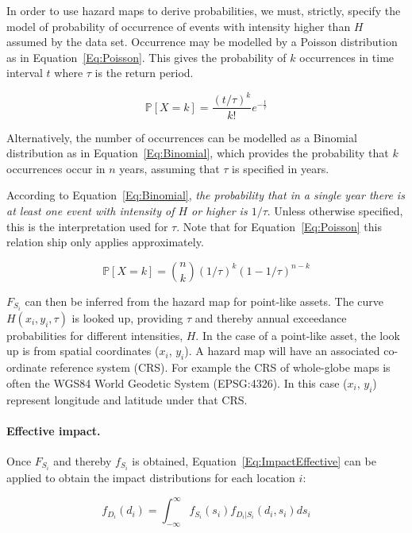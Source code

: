 \documentclass[a4paper,11pt]{extarticle} %
\begin{document}
In order to use hazard maps to derive probabilities, we must, strictly, specify the model of probability of occurrence of events with intensity higher than $H$ assumed by the data set. Occurrence may be modelled by a Poisson distribution as in Equation~\ref{Eq:Poisson}. This gives the probability of $k$ occurrences in time interval $t$ where $\tau$ is the return period.

 \begin{equation}
	\label{Eq:Poisson}
	\mathbb{P}[X = k] = \frac{(t / \tau)^k}{k!}  e^{-\frac{t}{\tau}}
\end{equation}

Alternatively, the number of occurrences can be modelled as a Binomial distribution as in Equation~\ref{Eq:Binomial}, which provides the probability that $k$ occurrences occur in $n$ years, assuming that $\tau$ is specified in years.  

According to Equation~\ref{Eq:Binomial}, \emph{the probability that in a single year there is at least one event with intensity of $H$ or higher is $1/\tau$}. Unless otherwise specified, this is the interpretation used for $\tau$. Note that for Equation~\ref{Eq:Poisson} this relation ship only applies approximately.

 \begin{equation}
	\label{Eq:Binomial}
	\mathbb{P}[X = k] = \binom{n}{k} (1/\tau)^k (1-1/\tau)^{n - k}
\end{equation}

$F_{S_i}$ can then be inferred from the hazard map for point-like assets. The curve $H(x_i, y_i, \tau)$ is looked up, providing $\tau$ and thereby annual exceedance probabilities for different intensities, $H$. In the case of a point-like asset, the look up is from spatial coordinates ($x_i$, $y_i$). A hazard map will have an associated co-ordinate reference system (CRS). For example the CRS of whole-globe maps is often the WGS84 World Geodetic System (EPSG:4326). In this case ($x_i$, $y_i$) represent longitude and latitude under that CRS. 

\paragraph{Effective impact.} Once $F_{S_i}$ and thereby $f_{S_i}$ is obtained, Equation~\ref{Eq:ImpactEffective} can be applied to obtain the impact distributions for each location $i$:

 \begin{equation}
	\label{Eq:ImpactMarginal2}
	f_{D_i}(d_i) = \int_{-\infty}^{\infty} f_{S_i}(s_i) f_{D_i|S_i}(d_i, s_i) ds_i
\end{equation}
\end{document}
